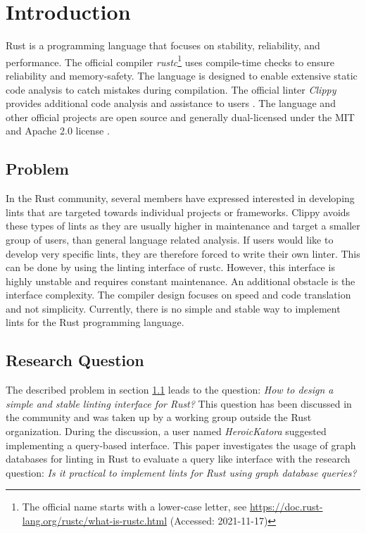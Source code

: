 \section{Introduction} \label{sec:intro}

Rust is a programming language that focuses on stability, reliability, and performance. The official compiler \emph{rustc}\footnote{The official name starts with a lower-case letter, see \url{https://doc.rust-lang.org/rustc/what-is-rustc.html} (Accessed: 2021-11-17)} uses compile-time checks to ensure reliability and memory-safety. \cite{rust-lang0000.website} The language is designed to enable extensive static code analysis to catch mistakes during compilation. The official linter \emph{Clippy} provides additional code analysis and assistance to users \cite{clippy0000.readme}. The language and other official projects are open source and generally dual-licensed under the MIT and Apache 2.0 license \cite{rust-lang0000.license}.

\subsection{Problem} \label{sec:intro.problem}

In the Rust community, several members have expressed interested in developing lints that are targeted towards individual projects or frameworks. Clippy avoids these types of lints as they are usually higher in maintenance and target a smaller group of users, than general language related analysis. If users would like to develop very specific lints, they are therefore forced to write their own linter. This can be done by using the linting interface of rustc. However, this interface is highly unstable and requires constant maintenance. An additional obstacle is the interface complexity. The compiler design focuses on speed and code translation and not simplicity. Currently, there is no simple and stable way to implement lints for the Rust programming language. \cite{rust-internals.stable-api}

\subsection{Research Question} \label{sec:intro.question}

The described problem in section \ref{sec:intro.problem} leads to the question: \emph{How to design a simple and stable linting interface for Rust?} This question has been discussed in the community and was taken up by a working group outside the Rust organization. During the discussion, a user named \emph{HeroicKatora} suggested implementing a query-based interface. \cite{rust-internals.stable-api} This paper investigates the usage of graph databases for linting in Rust to evaluate a query like interface with the research question: \emph{Is it practical to implement lints for Rust using graph database queries?}
 
